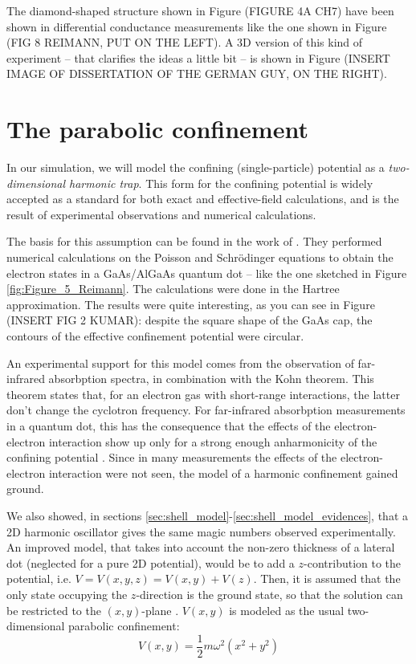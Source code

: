 \documentclass[a4paper,twoside,11pt]{book}
\begin{document}
The diamond-shaped structure shown in Figure (FIGURE 4A CH7) have been shown in differential conductance measurements like the one shown in Figure (FIG 8 REIMANN, PUT ON THE LEFT). A 3D version of this kind of experiment -- that clarifies the ideas a little bit -- is shown in Figure (INSERT IMAGE OF DISSERTATION OF THE GERMAN GUY, ON THE RIGHT).

\section{The parabolic confinement}
In our simulation, we will model the confining (single-particle) potential as a \emph{two-dimensional harmonic trap}. This form for the confining potential is widely accepted as a standard for both exact and effective-field calculations, and is the result of experimental observations and numerical calculations.

The basis for this assumption can be found in the work of \cite{Kumar1990}. They performed numerical calculations on the Poisson and Schr\"{o}dinger equations to obtain the electron states in a GaAs/AlGaAs quantum dot -- like the one sketched in Figure \ref{fig:Figure_5_Reimann}. The calculations were done in the Hartree approximation. The results were quite interesting, as you can see in Figure (INSERT FIG 2 KUMAR): despite the square shape of the GaAs cap, the contours of the effective confinement potential were circular.

An experimental support for this model comes from the observation of far-infrared absorbption spectra, in combination with the Kohn theorem. This theorem \citep[see][]{Kohn1961} states that, for an electron gas with short-range interactions, the latter don't change the cyclotron frequency. For far-infrared absorbption measurements in a quantum dot, this has the consequence that the effects of the electron-electron interaction show up only for a strong enough anharmonicity of the confining potential \citep[see][]{Reimann2002}. Since in many measurements the effects of the electron-electron interaction were not seen, the model of a harmonic confinement gained ground.

We also showed, in sections \ref{sec:shell_model}-\ref{sec:shell_model_evidences}, that a 2D harmonic oscillator gives the same magic numbers observed experimentally. An improved model, that takes into account the non-zero thickness of a lateral dot (neglected for a pure 2D potential), would be to add a $z$-contribution to the potential, i.e. $V=V(x,y,z) = V(x,y) + V(z)$. Then, it is assumed that the only state occupying the $z$-direction is the ground state, so that the solution can be restricted to the $(x,y)$-plane \citep[see][]{Reimann2002}. $V(x,y)$ is modeled as the usual two-dimensional parabolic confinement:
\begin{equation}
	V(x,y)=\frac{1}{2}m\omega^2(x^2+y^2)
\end{equation}
\end{document}
